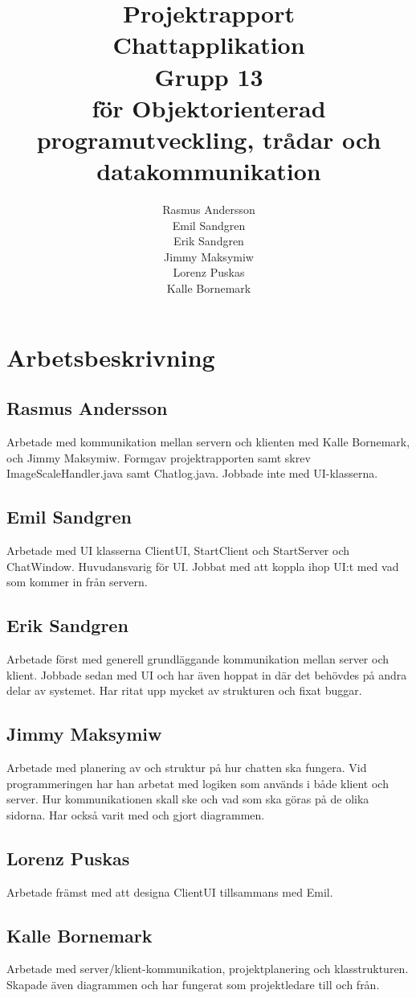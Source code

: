 \documentclass[a4paper,11pt]{article}
\title{Projektrapport\\
\large{Chattapplikation}\\ %
\large{Grupp 13}\\
\large{för Objektorienterad programutveckling, trådar och datakommunikation} }
\author{Rasmus Andersson\\Emil Sandgren\\Erik Sandgren\\Jimmy Maksymiw\\Lorenz Puskas\\Kalle Bornemark}
\begin{document}
\pagestyle{fancy}
\maketitle
\newpage
\tableofcontents
\newpage

\section{Arbetsbeskrivning}

\subsection{Rasmus Andersson} 
Arbetade med kommunikation mellan servern och klienten med Kalle Bornemark, och Jimmy Maksymiw. Formgav projektrapporten samt skrev ImageScaleHandler.java samt Chatlog.java. Jobbade inte med UI-klasserna.

\subsection{Emil Sandgren} 
Arbetade med UI klasserna ClientUI, StartClient och StartServer och ChatWindow. Huvudansvarig för UI. Jobbat med att koppla ihop UI:t med vad som kommer in från servern. 

\subsection{Erik Sandgren} 

Arbetade först med generell grundläggande kommunikation mellan server och klient. Jobbade sedan med UI och har även hoppat in där det behövdes på andra delar av systemet. Har ritat upp mycket av strukturen och fixat buggar.

\subsection{Jimmy Maksymiw} 
Arbetade med planering av och struktur på hur chatten ska fungera. Vid programmeringen har han arbetat med logiken som används i både klient och server. Hur kommunikationen skall ske och vad som ska göras på de olika sidorna. Har också varit med och gjort diagrammen. 
\subsection{Lorenz Puskas} 
Arbetade främst med att designa ClientUI tillsammans med Emil.
\subsection{Kalle Bornemark} 
Arbetade med server/klient-kommunikation, projektplanering och klasstrukturen. Skapade även diagrammen och har fungerat som projektledare till och från.
\end{document}
